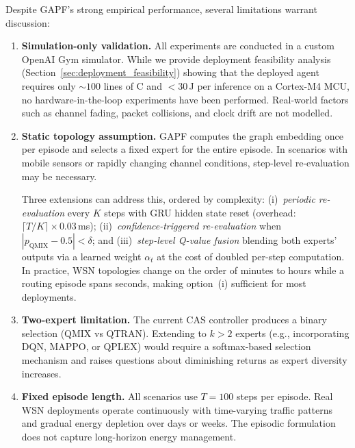 \documentclass[12pt, onecolumn, journal]{IEEEtran}
\begin{document}
Despite GAPF's strong empirical performance, several limitations warrant discussion:

\begin{enumerate}
    \item \textbf{Simulation-only validation.} All experiments are conducted in a custom OpenAI Gym simulator. While we provide deployment feasibility analysis (Section~\ref{sec:deployment_feasibility}) showing that the deployed agent requires only ${\sim}100$ lines of C and $<30$\,\textmu J per inference on a Cortex-M4 MCU, no hardware-in-the-loop experiments have been performed. Real-world factors such as channel fading, packet collisions, and clock drift are not modelled.
    
    \item \textbf{Static topology assumption.} GAPF computes the graph embedding once per episode and selects a fixed expert for the entire episode. In scenarios with mobile sensors or rapidly changing channel conditions, step-level re-evaluation may be necessary.
    
    \begin{revision}
    Three extensions can address this, ordered by complexity: (i)~\emph{periodic re-evaluation} every $K$ steps with GRU hidden state reset (overhead: $\lceil T/K \rceil \times 0.03$\,ms); (ii)~\emph{confidence-triggered re-evaluation} when $|p_{\text{QMIX}} - 0.5| < \delta$; and (iii)~\emph{step-level Q-value fusion} blending both experts' outputs via a learned weight $\alpha_t$ at the cost of doubled per-step computation. In practice, WSN topologies change on the order of minutes to hours while a routing episode spans seconds, making option~(i) sufficient for most deployments.
    \end{revision}
    
    \item \textbf{Two-expert limitation.} The current CAS controller produces a binary selection (QMIX vs QTRAN). Extending to $k > 2$ experts (e.g., incorporating DQN, MAPPO, or QPLEX) would require a softmax-based selection mechanism and raises questions about diminishing returns as expert diversity increases.
    
    \item \textbf{Fixed episode length.} All scenarios use $T = 100$ steps per episode. Real WSN deployments operate continuously with time-varying traffic patterns and gradual energy depletion over days or weeks. The episodic formulation does not capture long-horizon energy management.
    

\end{enumerate}
\end{document}
